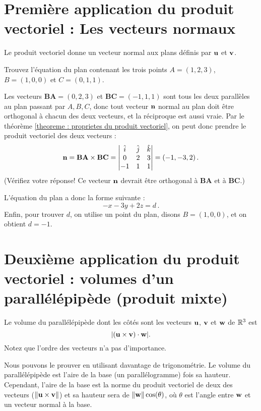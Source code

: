 \section[Application: les vecteurs normaux]{Première application du produit vectoriel : Les vecteurs normaux}

Le produit vectoriel donne un vecteur normal aux plans définis par $\mathbf{u}$ et $\mathbf{v}$.

\begin{myprob}
Trouvez l'équation du plan contenant les trois points $A = (1,2,3)$,
$B = (1,0,0)$ et $C = (0,1,1)$.

\begin{mysol}
Les vecteurs $\mathbf{BA} = (0,2,3)$ et $\mathbf{BC} = (-1,1,1)$ sont tous les deux
parallèles au plan passant par $A,B,C$, donc tout vecteur $\mathbf{n}$ normal au plan doit être orthogonal à chacun des deux vecteurs, et la réciproque est aussi vraie. Par le théorème \ref{theoreme : proprietes du produit vectoriel}, on peut donc prendre le produit vectoriel des deux vecteurs :
$$
\mathbf{n}
=
\mathbf{BA} \times \mathbf{BC}
=
 \left| \begin{matrix}
\hat{i} & \hat{j} & \hat{k} \\
0 & 2 & 3\\
-1 & 1 & 1 \end{matrix} \right| = (-1, -3, 2)\,.
$$
(Vérifiez votre réponse!  Ce vecteur $\mathbf{n}$ devrait être orthogonal à $\mathbf{BA}$ et à $\mathbf{BC}$.)

L'équation du plan a donc la forme suivante :
$$
-x -3y + 2z = d\,.
$$
Enfin, pour trouver $d$, on utilise un point du plan, disons $B= (1,0,0)$, et on obtient $d=-1$.
\end{mysol} \end{myprob}

\section[Application: volume d'un parallélépipède]{Deuxième application du produit vectoriel : volumes d'un parallélépipède (produit mixte)}

\begin{theorem} 
Le volume du parallélépipède dont les côtés sont les vecteurs $\mathbf{u}$, $\mathbf{v}$ et $\mathbf{w}$
de $\mathbb{R}^3$ est
$$
\vert (\mathbf{u} \times \mathbf{v}) \cdot \mathbf{w} \vert. 
$$
Notez que l'ordre des vecteurs n'a pas d'importance.
\end{theorem}

Nous pouvons le prouver en utilisant davantage de trigonométrie. Le volume
du parallélépipède est l'aire de la base (un parallélogramme)
fois sa hauteur. Cependant, l'aire de la base est la norme du produit vectoriel
de deux des vecteurs ($\Vert \mathbf{u} \times \mathbf{v} \Vert$) et sa hauteur sera de 
$\Vert \mathbf{w} \Vert \cos(\theta)$, où $\theta$ est l'angle entre
$\mathbf{w}$ et un vecteur normal à la base.


